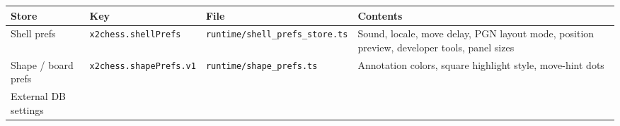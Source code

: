 \documentclass[]{article}
\begin{document}
\begin{longtable}[]{@{}llll@{}}
\toprule
\begin{minipage}[b]{0.05\columnwidth}\raggedright\strut
Store\strut
\end{minipage} & \begin{minipage}[b]{0.05\columnwidth}\raggedright\strut
Key\strut
\end{minipage} & \begin{minipage}[b]{0.05\columnwidth}\raggedright\strut
File\strut
\end{minipage} & \begin{minipage}[b]{0.05\columnwidth}\raggedright\strut
Contents\strut
\end{minipage}\tabularnewline
\midrule
\endhead
\begin{minipage}[t]{0.05\columnwidth}\raggedright\strut
Shell prefs\strut
\end{minipage} & \begin{minipage}[t]{0.05\columnwidth}\raggedright\strut
\texttt{x2chess.shellPrefs}\strut
\end{minipage} & \begin{minipage}[t]{0.05\columnwidth}\raggedright\strut
\texttt{runtime/shell\_prefs\_store.ts}\strut
\end{minipage} & \begin{minipage}[t]{0.05\columnwidth}\raggedright\strut
Sound, locale, move delay, PGN layout mode, position preview, developer
tools, panel sizes\strut
\end{minipage}\tabularnewline
\begin{minipage}[t]{0.05\columnwidth}\raggedright\strut
Shape / board prefs\strut
\end{minipage} & \begin{minipage}[t]{0.05\columnwidth}\raggedright\strut
\texttt{x2chess.shapePrefs.v1}\strut
\end{minipage} & \begin{minipage}[t]{0.05\columnwidth}\raggedright\strut
\texttt{runtime/shape\_prefs.ts}\strut
\end{minipage} & \begin{minipage}[t]{0.05\columnwidth}\raggedright\strut
Annotation colors, square highlight style, move-hint dots\strut
\end{minipage}\tabularnewline
\begin{minipage}[t]{0.05\columnwidth}\raggedright\strut
External DB settings\strut
\end{minipage} & \begin{minipage}[t]{0.05\columnwidth}\raggedright\strut

\end{minipage}
\end{longtable}
\end{document}
